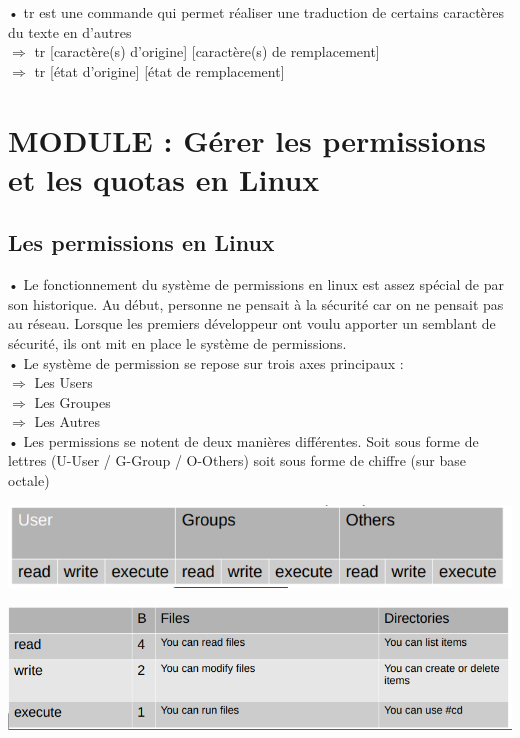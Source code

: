 \documentclass[a4paper, 11pt, french, oneside]{book}
\begin{document}
• tr est une commande qui permet réaliser une traduction de certains caractères du texte en d’autres\\
$\Rightarrow$ tr [caractère(s) d’origine] [caractère(s) de remplacement]\\
$\Rightarrow$ tr [état d’origine] [état de remplacement]

 
\chapter{MODULE : Gérer les permissions et
les quotas en Linux}
\section{\Large Les permissions en Linux} 

• Le fonctionnement du système de permissions en linux est assez spécial de par son historique. Au début, personne ne pensait à la sécurité car on ne pensait pas au réseau. Lorsque les premiers développeur ont voulu apporter un semblant de sécurité, ils ont mit en place le système de permissions.\\
• Le système de permission se repose sur trois axes principaux :\\
 $\Rightarrow$ Les Users\\
 $\Rightarrow$ Les Groupes\\
 $\Rightarrow$ Les Autres \\

• Les permissions se notent de deux manières différentes. Soit sous forme de lettres (U-User / G-Group / O-Others) soit sous forme de chiffre (sur base octale)\\

\begin{flushleft}
\includegraphics[scale=0.6]{PermissionsLettres.png}
\end{flushleft}

\begin{flushleft}
\includegraphics[scale=0.6]{PermissionsChiffres.png}
\end{flushleft}
\end{document}
